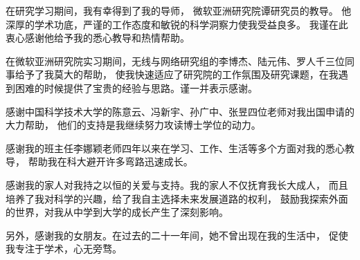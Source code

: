 \begin{acknowledgements}

在研究学习期间，我有幸得到了我的导师，
微软亚洲研究院谭研究员的教导。
他深厚的学术功底，严谨的工作态度和敏锐的科学洞察力使我受益良多。
我谨在此衷心感谢他给予我的悉心教导和热情帮助。

在微软亚洲研究院实习期间，无线与网络研究组的李博杰、陆元伟、罗人千三位同事给予了我莫大的帮助，
使我快速适应了研究院的工作氛围及研究课题，在我遇到困难的时候提供了宝贵的经验与思路。谨一并表示感谢。

感谢中国科学技术大学的陈意云、冯新宇、孙广中、张昱四位老师对我出国申请的大力帮助，
他们的支持是我继续努力攻读博士学位的动力。

感谢我的班主任李娜颖老师四年以来在学习、工作、生活等多个方面对我的悉心教导，
帮助我在科大避开许多弯路迅速成长。

感谢我的家人对我持之以恒的关爱与支持。我的家人不仅抚育我长大成人，
而且培养了我对科学的兴趣，给了我自主选择未来发展道路的权利，
鼓励我探索外面的世界，对我从中学到大学的成长产生了深刻影响。

另外，感谢我的女朋友。在过去的二十一年间，她不曾出现在我的生活中，
促使我专注于学术，心无旁骛。

\bigskip
{}

\end{acknowledgements}
